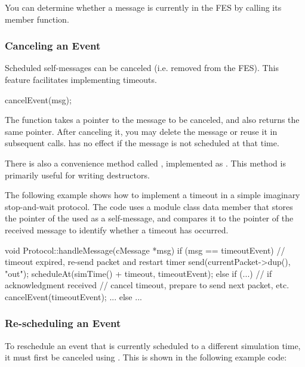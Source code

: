 You can determine whether a message is currently in the FES by calling
its  member function.

\subsubsection{Canceling an Event}
\label{sec:simple-modules:canceling}

Scheduled self-messages can be canceled
(i.e. removed from the FES).
This feature facilitates implementing timeouts.

\begin{cpp}
cancelEvent(msg);
\end{cpp}

The  function takes a pointer to the message to
be canceled, and also returns the same pointer. After canceling it,
you may delete the message or reuse it in subsequent 
calls.  has no effect if the message is not
scheduled at that time.

There is also a convenience method called ,
implemented as .
This method is primarily useful for writing destructors.

The following example shows how to implement a timeout in a simple
imaginary stop-and-wait protocol. The code uses a 
module class data member that stores the pointer of the  used
as a self-message, and compares it to the pointer of the received message
to identify whether a timeout has occurred.

\begin{cpp}
void Protocol::handleMessage(cMessage *msg)
{
    if (msg == timeoutEvent) {
        // timeout expired, re-send packet and restart timer
        send(currentPacket->dup(), "out");
        scheduleAt(simTime() + timeout, timeoutEvent);
    }
    else if (...) {  // if acknowledgment received
        // cancel timeout, prepare to send next packet, etc.
        cancelEvent(timeoutEvent);
        ...
    }
    else {
       ...
    }
}
\end{cpp}


\subsubsection{Re-scheduling an Event}
\label{sec:simple-modules:rescheduling}

To reschedule an event that is currently scheduled to a different
simulation time, it must first be canceled using .
This is shown in the following example code:

